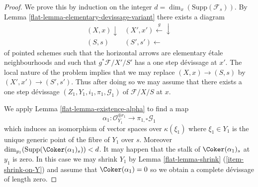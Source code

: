 \begin{proof}

We prove this by induction on the integer
$d = \dim_x(\text{Supp}(\mathcal{F}_s))$.
By
Lemma \ref{flat-lemma-elementary-devissage-variant}
there exists a diagram
$$
\begin{array}{cc}(X, x) \downarrow & (X', x') \overset{g}{\longleftarrow}\downarrow \\ (S, s) & (S', s') \longleftarrow\end{array}
$$
of pointed schemes such that the horizontal
arrows are elementary \'etale neighbourhoods
and such that $g^*\mathcal{F}/X'/S'$ has a one step d\'evissage at $x'$.
The local nature of the problem implies that we may replace
$(X, x) \to (S, s)$ by $(X', x') \to (S', s')$. Thus after doing so
we may assume that there exists a one step d\'evissage
$(Z_1, Y_1, i_1, \pi_1, \mathcal{G}_1)$ of $\mathcal{F}/X/S$ at $x$.

\medskip\noindent
We apply
Lemma \ref{flat-lemma-existence-alpha}
to find a map
$$
\alpha_1 :
\mathcal{O}_{Y_1}^{\oplus r_1}
\longrightarrow
\pi_{1, *}\mathcal{G}_1
$$
which induces an isomorphism of vector spaces over $\kappa(\xi_1)$
where $\xi_1 \in Y_1$ is the unique generic point of the fibre of
$Y_1$ over $s$. Moreover
$\dim_{y_1}(\text{Supp}(\Coker(\alpha_1)_s)) < d$.
It may happen that the stalk of $\Coker(\alpha_1)_s$
at $y_1$ is zero. In this case we may shrink $Y_1$ by
Lemma \ref{flat-lemma-shrink} (\ref{item-shrink-on-Y})
and assume that $\Coker(\alpha_1) = 0$ so we obtain a
complete d\'evissage of length zero.


\end{proof}
